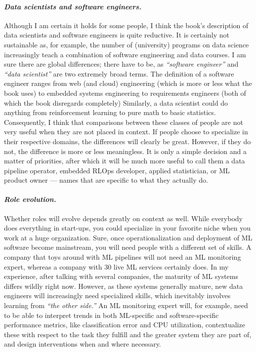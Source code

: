     \paragraph{\textit{Data scientists and software engineers.}} Although I am certain it holds for some people, I think the book's description of data scientists and software engineers is quite reductive.
    It is certainly not sustainable as, for example, the number of (university) programs on data science increasingly teach a combination of software engineering and data courses.
    I am sure there are global differences; there have to be, as \textit{``software engineer''} and \textit{``data scientist''} are two extremely broad terms.
    The definition of a software engineer ranges from web (and cloud) engineering (which is more or less what the book uses) to embedded systems engineering to requirements engineers (both of which the book disregards completely) 
    Similarly, a data scientist could do anything from reinforcement learning to pure math to basic statistics.
    Consequently, I think that comparisons between these classes of people are not very useful when they are not placed in context.
    If people choose to specialize in their respective domains, the differences will clearly be great.
    However, if they do not, the difference is more or less meaningless.
    It is only a simple decision and a matter of priorities, after which it will be much more useful to call them a data pipeline operator, embedded RLOps developer, applied statistician, or ML product owner --- names that are specific to what they actually do.


    \paragraph{\textit{Role evolution.}} Whether roles will evolve depends greatly on context as well.
    While everybody does everything in start-ups, you could specialize in your favorite niche when you work at a huge organization.
    Sure, once operationalization and deployment of ML software become mainstream, you will need people with a different set of skills.
    A company that toys around with ML pipelines will not need an ML monitoring expert, whereas a company with 30 live ML services certainly does.
    In my experience, after talking with several companies, the maturity of ML systems differs wildly right now. 
    However, as these systems generally mature, new data engineers will increasingly need specialized skills, which inevitably involves learning from \textit{``the other side.''}
    An ML monitoring expert will, for example, need to be able to interpret trends in both ML-specific and software-specific performance metrics, like classification error and CPU utilization, contextualize these with respect to the task they fulfill and the greater system they are part of, and design interventions when and where necessary.
    

